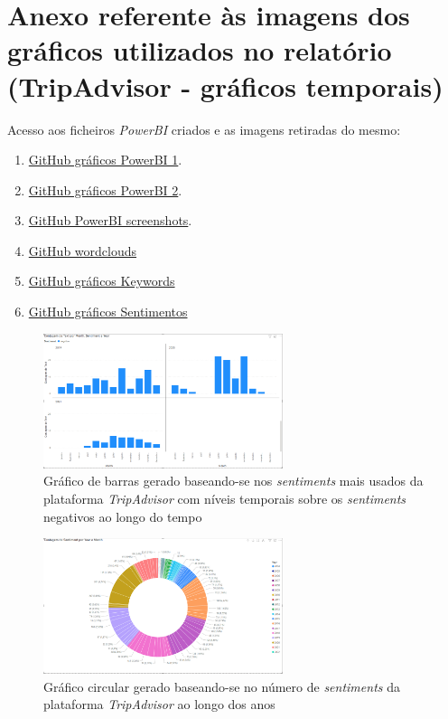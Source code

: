 \chapter{Anexo referente às imagens dos gráficos utilizados no relatório (TripAdvisor - gráficos temporais)}

Acesso aos ficheiros \textit{PowerBI} criados e as imagens retiradas do mesmo:

\begin{enumerate}
    \item \href{https://github.com/CatKinKitKat/pi2021/blob/master/projecto/sql/Graphs.pbix}{GitHub gráficos PowerBI 1}.
    \item \href{https://github.com/CatKinKitKat/pi2021/blob/master/projecto/sql/qq.pbix}{GitHub gráficos PowerBI 2}.
    \item \href{https://github.com/CatKinKitKat/pi2021/tree/master/projecto/sql/screenshotsPowerBI}{GitHub PowerBI screenshots}.
    \item \href{https://github.com/CatKinKitKat/pi2021/tree/master/projecto/datascience/sql/wordclouds}{GitHub wordclouds}
    \item \href{https://github.com/CatKinKitKat/pi2021/tree/master/projecto/datascience/sql/graphs/keywords}{GitHub gráficos Keywords}
    \item \href{https://github.com/CatKinKitKat/pi2021/tree/master/projecto/datascience/sql/graphs/sentiments}{GitHub gráficos Sentimentos}
\end{enumerate}

\label{an6}
\begin{figure}[!htb]
\centering
\includegraphics[width=7cm]{figuras/NegPerYear/4.PNG}
\caption{Gráfico de barras gerado baseando-se nos \textit{sentiments} mais usados da plataforma \textit{TripAdvisor} com níveis temporais sobre os \textit{sentiments} negativos ao longo do tempo}
\label{fig:exemplofig}
\end{figure}

\begin{figure}[!htb]
\centering
\includegraphics[width=7cm]{figuras/NrReviewsPerYear/CircleGraph.PNG}
\caption{Gráfico circular gerado baseando-se no número de \textit{sentiments} da plataforma \textit{TripAdvisor} ao longo dos anos}
\label{fig:exemplofig}
\end{figure}

